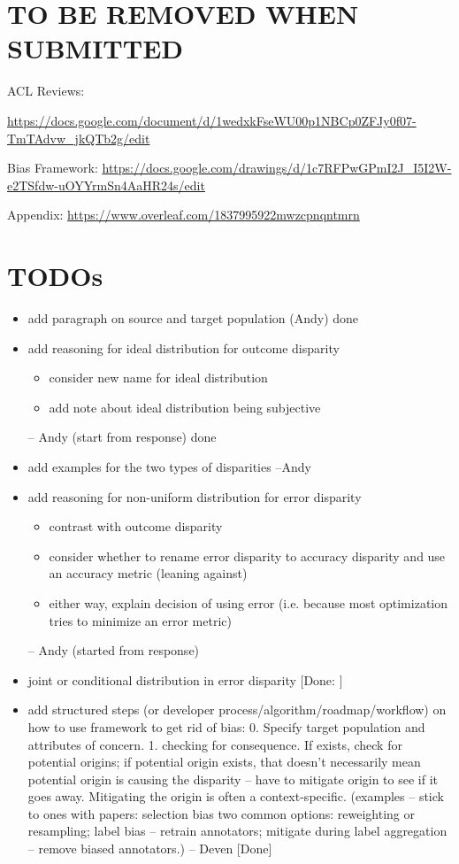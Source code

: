 \section*{TO BE REMOVED WHEN SUBMITTED}
ACL Reviews:

\url{https://docs.google.com/document/d/1wedxkFseWU00p1NBCp0ZFJy0f07-TmTAdvw_jkQTb2g/edit}

Bias Framework:
\url{https://docs.google.com/drawings/d/1c7RFPwGPmI2J_I5I2W-e2TSfdw-uOYYrmSn4AaHR24s/edit}

Appendix:
\url{https://www.overleaf.com/1837995922mwzcpnqntmrn}
\section*{TODOs}
\begin{itemize}
    
    \item add paragraph on source and target population (Andy) done

    \item add reasoning for ideal distribution for outcome disparity
    \begin{itemize}
        \item consider new name for ideal distribution
        \item add note about ideal distribution being subjective
    \end{itemize} -- Andy (start from response) done 
    
    \item add examples for the two types of disparities --Andy

    \item add reasoning for non-uniform distribution for error disparity
    \begin{itemize}
        \item contrast with outcome disparity 
        \item consider whether to rename error disparity to accuracy disparity and use an accuracy metric (leaning against)
        \item either way, explain decision of using error (i.e. because most optimization tries to minimize an error metric)
    \end{itemize} -- Andy (started from response)

    \item joint or conditional distribution in error disparity [Done: ]
    
    \item add structured steps (or developer process/algorithm/roadmap/workflow) on how to use framework to get rid of bias: 0. Specify target population and attributes of concern. 1. checking for consequence. If exists, check for potential origins; if potential origin exists, that doesn't necessarily mean potential origin is causing the disparity -- have to mitigate origin to see if it goes away. Mitigating the origin is often a context-specific. (examples -- stick to ones with papers: selection bias two common options: reweighting or resampling; label bias -- retrain annotators; mitigate during label aggregation -- remove biased annotators.) -- Deven [Done]
    

\end{itemize}
